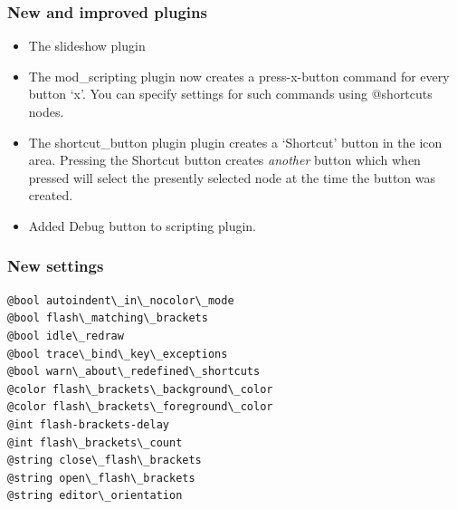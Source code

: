 \documentclass[a4paper,10pt,english]{sphinxmanual}
\begin{document}
\subsubsection{New and improved plugins}
\label{what-is-new:id24}\begin{itemize}
\item {} 
The slideshow plugin

\item {} 
The mod\_scripting plugin now creates a press-x-button command for every button `x'.
You can specify settings for such commands using @shortcuts nodes.

\item {} 
The shortcut\_button plugin plugin creates a `Shortcut' button in the icon area.
Pressing the Shortcut button creates \emph{another} button which when pressed
will select the presently selected node at the time the button was created.

\item {} 
Added Debug button to scripting plugin.

\end{itemize}


\subsubsection{New settings}
\label{what-is-new:id25}
\begin{Verbatim}[commandchars=\\\{\}]
@bool autoindent\_in\_nocolor\_mode
@bool flash\_matching\_brackets
@bool idle\_redraw
@bool trace\_bind\_key\_exceptions
@bool warn\_about\_redefined\_shortcuts
@color flash\_brackets\_background\_color
@color flash\_brackets\_foreground\_color
@int flash-brackets-delay
@int flash\_brackets\_count
@string close\_flash\_brackets
@string open\_flash\_brackets
@string editor\_orientation
\end{Verbatim}
\end{document}
